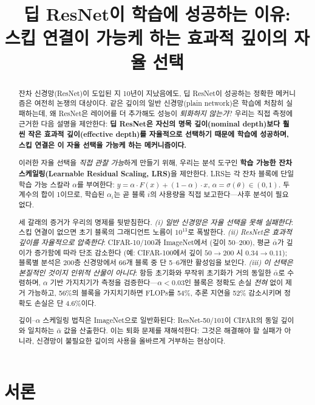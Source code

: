 \documentclass{bmvc2k}
\title{딥 ResNet이 학습에 성공하는 이유:\\
스킵 연결이 가능케 하는 효과적 깊이의 자율 선택}
\begin{document}
\maketitle

\begin{abstract}
잔차 신경망(ResNet)이 도입된 지 10년이 지났음에도, 딥 ResNet이 성공하는 정확한 메커니즘은 여전히 논쟁의 대상이다. 같은 깊이의 일반 신경망(plain network)은 학습에 처참히 실패하는데, 왜 ResNet은 레이어를 더 추가해도 성능이 \emph{퇴화하지 않는가}? 우리는 직접 측정에 근거한 다음 설명을 제안한다: \textbf{딥 ResNet은 자신의 명목 깊이(nominal depth)보다 훨씬 작은 효과적 깊이(effective depth)를 자율적으로 선택하기 때문에 학습에 성공하며, 스킵 연결은 이 자율 선택을 가능케 하는 메커니즘이다.}

이러한 자율 선택을 \emph{직접 관찰 가능}하게 만들기 위해, 우리는 분석 도구인 \textbf{학습 가능한 잔차 스케일링(Learnable Residual Scaling, LRS)}을 제안한다. LRS는 각 잔차 블록에 단일 학습 가능 스칼라 $\alpha$를 부여한다: $y = \alpha \cdot F(x) + (1 - \alpha) \cdot x$, $\alpha = \sigma(\theta) \in (0,1)$. 두 계수의 합이 1이므로, 학습된 $\alpha_i$는 곧 블록 $i$의 사용량을 직접 보고한다---사후 분석이 필요 없다.

세 갈래의 증거가 우리의 명제를 뒷받침한다. \emph{(i) 일반 신경망은 자율 선택을 못해 실패한다}: 스킵 연결이 없으면 초기 블록의 그래디언트 노름이 $10^{13}$로 폭발한다. \emph{(ii) ResNet은 효과적 깊이를 자율적으로 압축한다}: CIFAR-10/100과 ImageNet에서 (깊이 50--200), 평균 $\bar{\alpha}$가 깊이가 증가함에 따라 단조 감소한다 (예: CIFAR-100에서 깊이 $50 \to 200$ 시 $0.34 \to 0.11$); 블록별 분석은 200층 신경망에서 66개 블록 중 단 5--6개만 활성임을 보인다. \emph{(iii) 이 선택은 본질적인 것이지 인위적 산물이 아니다}: 항등 초기화와 무작위 초기화가 거의 동일한 $\bar{\alpha}$로 수렴하며, $\alpha$ 기반 가지치기가 측정을 검증한다---$\alpha < 0.03$인 블록은 정확도 손실 \emph{전혀} 없이 제거 가능하고, 56\%의 블록을 가지치기하면 FLOPs를 54\%, 추론 지연을 52\% 감소시키며 정확도 손실은 단 4.6\%이다.

깊이--$\alpha$ 스케일링 법칙은 ImageNet으로 일반화된다: ResNet-50/101이 CIFAR의 동일 깊이와 일치하는 $\bar{\alpha}$ 값을 산출한다. 이는 퇴화 문제를 재해석한다: 그것은 해결해야 할 실패가 아니라, 신경망이 불필요한 깊이의 사용을 올바르게 거부하는 현상이다.
\end{abstract}

\section{서론}
\label{sec:intro}
\end{document}
